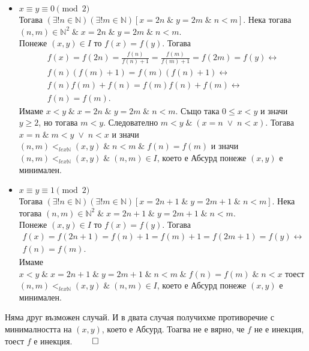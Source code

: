\documentclass[a4paper, 12pt, oneside]{article}
\begin{document}
\begin{itemize}
    \item \(x \equiv y \equiv 0 \pmod{2}\) \\
    Тогава \((\exists! n \in \mathbb{N})(\exists! m \in \mathbb{N})[x = 2n \; \& \; y = 2m \; \& \; n < m]\). Нека тогава \\
    \((n, m) \in \mathbb{N}^2 \; \& \; x = 2n \; \& \; y = 2m \; \& \; n < m\). \\
    Понеже \((x, y) \in I\) то \(f(x) = f(y)\). Тогава
    \begin{align*}
        f(x) = f(2n) = \displaystyle\frac{f(n)}{f(n) + 1} = \displaystyle\frac{f(m)}{f(m) + 1} = f(2m) = f(y) \longleftrightarrow\\
        f(n)(f(m) + 1) = f(m)(f(n) + 1)  \longleftrightarrow\\
        f(n)f(m) + f(n) = f(m)f(n) + f(m) \longleftrightarrow\\
        f(n) = f(m).
    \end{align*}
    Имаме \(x < y \; \& \; x = 2n \; \& \; y = 2m \; \& \; n < m\).
    Също така \(0 \leq x < y\) и значи \(y \geq 2\), но тогава \(m < y\).
    Следователно \(m < y \; \& \; (x = n \; \lor \; n < x)\). Тогава \(x = n \; \& \; m < y \; \lor \; n < x\)
    и значи \((n , m) <_{lex \mathbb{N}} (x, y) \; \& \; n < m \; \& \; f(n) = f(m)\) и значи
    \((n , m) <_{lex \mathbb{N}} (x, y) \; \& \; (n, m) \in I\), което е Абсурд понеже \((x, y)\) е минимален.
    \item \(x \equiv y \equiv 1 \pmod{2}\) \\
    Тогава \((\exists! n \in \mathbb{N})(\exists! m \in \mathbb{N})[x = 2n + 1 \; \& \; y = 2m + 1\; \& \; n < m]\). Нека тогава
    \((n, m) \in \mathbb{N}^2 \; \& \; x = 2n + 1\; \& \; y = 2m + 1 \; \& \; n < m\). \\
    Понеже \((x, y) \in I\) то \(f(x) = f(y)\). Тогава
    \begin{align*}
        f(x) = f(2n + 1) = f(n) + 1 = f(m) + 1 = f(2m + 1) = f(y) \longleftrightarrow \\
        f(n) = f(m).
    \end{align*}
    Имаме \(x < y \; \& \; x = 2n + 1 \; \& \; y = 2m + 1 \; \& \; n < m \; \& \; f(n) = f(m) \; \& \; n < x\) 
    тоест \((n , m) <_{lex \mathbb{N}} (x, y) \; \& \; (n, m) \in I\), което е Абсурд понеже \((x, y)\) е минимален.
\end{itemize}
Няма друг възможен случай.
И в двата случая получихме противоречие с минималността на \((x, y)\), което е Абсурд.
Тоагва не е вярно, че  \(f\) не е инекция, тоест \(f\) е инекция. \(\qed\)
\end{document}
